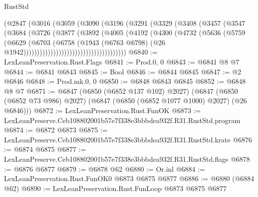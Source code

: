 \begin{lexlean}{RustStd}
\begin{coremodule}
                              (@2847
                                (@3016
                                  (@3059
                                    (@3090
                                      (@3196
                                        (@3291
                                          (@3329
                                            (@3408
                                              (@3457
                                                (@3547
                                                  (@3684
                                                    (@3726
                                                      (@3877
                                                        (@3892
                                                          (@4005
                                                            (@4192
                                                              (@4300
                                                                (@4732
                                                                  (@5636
                                                                    (@5759
                                                                      (@6629
                                                                        (@6703
                                                                          (@6758
                                                                            (@1943
                                                                              (@6763 @6798)
                                                                              (@26
                                                                                @1942))))))))))))))))))))))))))))))))))))))
@6840 := LexLeanPreservation.Rust.Flags
@6841 := Prod.{0, 0}
@6843 := @6841 @8 @7
@6844 := @6841 @6843
@6845 := Bool
@6846 := @6844 @6845
@6847 := @2 @6846
@6848 := Prod.mk.{0, 0}
@6850 := @6848 @6843 @6845
@6852 := @6848 @8 @7
@6871 := @6847
    (@6850 (@6852 @137 @102) @2027)
    (@6847 (@6850 (@6852 @73 @986) @2027) (@6847 (@6850 (@6852 @1077 @1000) @2027) (@26 @6846)))
@6872 := LexLeanPreservation.Rust.FunOK
@6873 := LexLeanPreserve.Ceb108802001b57e7f338e3bbbdea932f.R31.RustStd.program
@6874 := @6872 @6873
@6875 := LexLeanPreserve.Ceb108802001b57e7f338e3bbbdea932f.R31.RustStd.krate
@6876 := @6874 @6875
@6877 := LexLeanPreserve.Ceb108802001b57e7f338e3bbbdea932f.R31.RustStd.flags
@6878 := @6876 @6877
@6879 := @6878 @62
@6880 := Or.inl
@6884 := LexLeanPreservation.Rust.FunOK0 @6873 @6875 @6877
@6886 := @6880 (@6884 @62)
@6890 := LexLeanPreservation.Rust.FunLoop @6873 @6875 @6877

\end{coremodule}
\end{lexlean}
